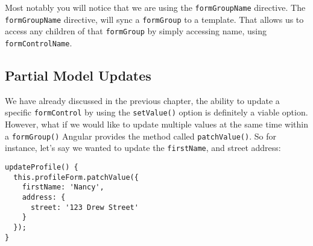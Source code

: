 Most notably you will notice that we are using the \lstinline{formGroupName}
directive. The \lstinline{formGroupName} directive, will sync a 
\lstinline{formGroup} to a template. That allows us to access any children of
that \lstinline{formGroup} by simply accessing name, using \lstinline{formControlName}. 

\subsection{ Partial Model Updates }
We have already discussed in the previous chapter, the ability to update a 
specific \lstinline{formControl} by using the \lstinline{setValue()} option is 
definitely a viable option. However, what if we would like to update multiple 
values at the same time within a \lstinline{formGroup()} Angular provides the 
method called \lstinline{patchValue()}. So for instance, let's say we wanted
to update the \lstinline{firstName}, and street address: 
\begin{lstlisting}
updateProfile() {
  this.profileForm.patchValue({
    firstName: 'Nancy',
    address: {
      street: '123 Drew Street'
    }
  });
}
\end{lstlisting}

